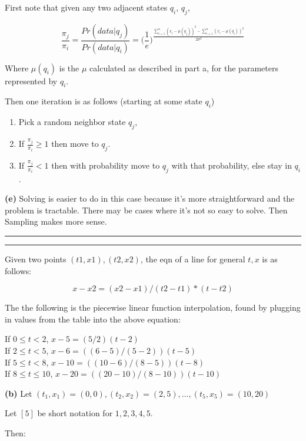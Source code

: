 \documentclass[11pt,letterpaper]{article}
\newcommand{\question}[1] {\vspace{.25in} \hrule\vspace{0.5em}
\noindent{\bf #1} \vspace{0.5em}
\hrule \vspace{.10in}}
\renewcommand{\part}[1] {\vspace{.10in} {\bf (#1)}}
\begin{document}
First note that given any two adjacent states $q_i$, $q_j$,

$$\frac{\pi_j}{\pi_i} = \frac{Pr(data | q_j)}{Pr(data | q_i)} = \bigg(\frac{1}{e}\bigg)^{\frac{\sum_{i=1}^{n} (x_i-\mu(q_j))^2 - \sum_{i=1}^{n} (x_i-\mu(q_i))^2}{2\sigma^2}}$$

Where $\mu(q_i)$ is the $\mu$ calculated as described in part a, for the parameters represented by $q_i$.

Then one iteration is as follows (starting at some state $q_i$)

\begin{enumerate}
\item Pick a random neighbor state $q_j$,
\item If $\frac{\pi_j}{\pi_i} \geq 1$ then move to $q_j$.
\item If $\frac{\pi_j}{\pi_i} < 1$ then with probability move to $q_j$ with that probability, else stay in $q_i$.
\end{enumerate}


\part{e}
Solving is easier to do in this case because it's more straightforward and the problem is tractable.
There may be cases where it's not so easy to solve. Then Sampling makes more sense.

\question{3}
Given two points $(t1,x1),(t2,x2)$, the eqn of a line for general $t,x$ is as follows:

$$x - x2 = (x2 - x1)/(t2 - t1) * (t - t2)$$

The the following is the piecewise linear function interpolation, found by plugging in values from the table into the above equation:

If $0 \leq t < 2$, $x - 5 = (5/2)(t - 2)$\\
If $2 \leq t < 5$, $x-6 = ((6-5)/(5-2))(t - 5)$\\
If $5 \leq t < 8$, $x-10 = ((10-6)/(8-5))(t - 8)$\\
If $8 \leq t \leq 10$, $x-20 = ((20-10)/(8-10))(t - 10)$

\part{b}
Let $(t_1, x_1) = (0,0), (t_2, x_2) = (2,5), ... , (t_5,x_5) = (10,20) $

Let $[5]$ be short notation for ${1,2,3,4,5}$.

Then:
\end{document}
